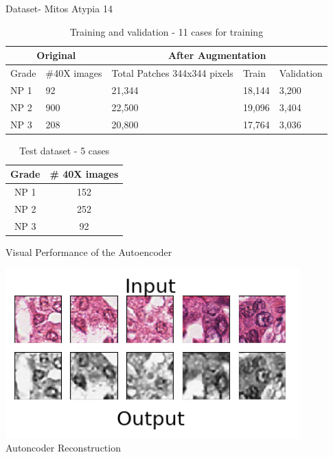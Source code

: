 \documentclass[usenames,dvipsnames]{beamer}
\begin{document}
\begin{frame}{Dataset- Mitos Atypia 14}

\begin{table}[]
\begin{tabular}{|m{1cm}|m{2cm}|m{3cm}|m{1.3cm}|m{1.3cm}|}
\hline
\multicolumn{2}{|c|}{Original} & \multicolumn{3}{c|}{After Augmentation} \\ \hline  \hline
\centering
Grade &\centering  \#40X images &\centering Total Patches 344x344 pixels&\centering  Train & Validation \\ \hline
NP 1  & 92            & 21,344  &   18,144   & 3,200          \\ \hline
NP 2  & 900           & 22,500  &  19,096    & 3,404     \\ \hline
NP 3  & 208           & 20,800  &  17,764    & 3,036     \\ \hline
\end{tabular}
\caption{Training and validation - 11 cases for training}
\end{table}
    \begin{table}[]
\begin{tabular}{|c|c|}
\hline
Grade & \# 40X images \\ \hline
NP 1  & 152           \\ \hline
NP 2  & 252           \\ \hline
NP 3  & 92            \\ \hline
\end{tabular}
\caption{Test dataset - 5 cases}
\end{table}
\end{frame}    
    
\begin{frame}{Visual Performance of the Autoencoder}


    \centering
    \includegraphics[width=0.85\textwidth]{imagenes_cnn/autoencoderresponse.png}
    \\Autoncoder Reconstruction


\end{frame}
\end{document}

